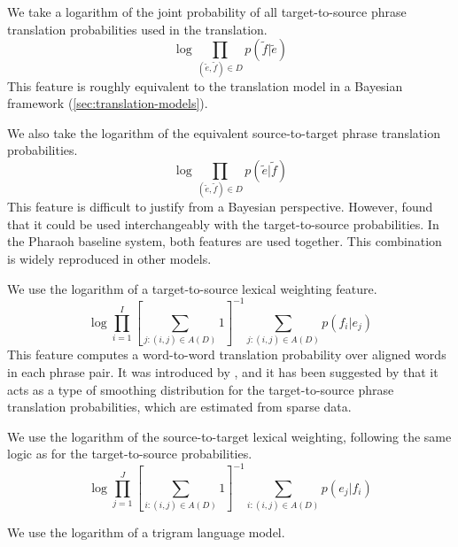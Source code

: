 \begin{asparaenum}
\item We take a logarithm of the joint probability of all
target-to-source phrase translation probabilities used in the
translation.  
\begin{equation}\label{eq:inv-ptp}
	\log \prod_{(\tilde{e},\tilde{f}) \in D} p(\tilde{f}|\tilde{e}) 
\end{equation}
\noindent This feature is roughly
equivalent to the translation model in a Bayesian framework
(\textsection\ref{sec:translation-models}).

\item We also take the logarithm of the equivalent source-to-target
phrase translation probabilities.  
\begin{equation}
	\log \prod_{(\tilde{e},\tilde{f}) \in D} p(\tilde{e}|\tilde{f}) \label{eq:ptp}
\end{equation}
\noindent This feature is difficult
to justify from a Bayesian perspective.  However, 
\citet{Och:1999:emnlp} found that it could be used interchangeably
with the target-to-source probabilities.  In the Pharaoh baseline system, both features
are used together.  This combination is widely reproduced in other models.

\item We use the logarithm of a target-to-source lexical weighting feature.
\begin{equation}
	\log \prod_{i=1}^I \left[\sum_{j: (i,j) \in A(D)}1\right]^{-1}\sum_{j: (i,j) \in A(D)} p(f_i|e_j) \label{eq:inv-lex}
\end{equation}
\noindent This feature computes a word-to-word translation
probability over aligned words in each phrase pair.  It was
introduced by \citet{Koehn:2003:naacl}, and it has been suggested by 
\citet{Foster:2006:emnlp} that it acts as a type of smoothing distribution
for the target-to-source phrase translation probabilities, which are estimated from
sparse data.

\item We use the logarithm of the source-to-target lexical weighting, 
following the same logic as for the target-to-source probabilities.
\begin{equation}
	\log \prod_{j=1}^J \left[\sum_{i: (i,j) \in A(D)}1\right]^{-1}\sum_{i: (i,j) \in A(D)} p(e_j|f_i) \label{eq:lex}
\end{equation}

\item We use the logarithm of a trigram language model.


\end{asparaenum}
